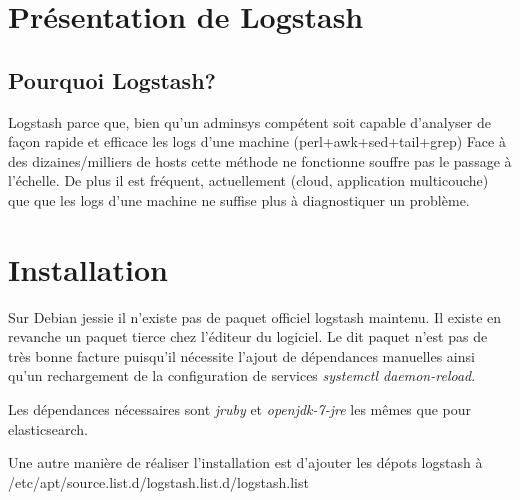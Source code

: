 \section{Présentation de Logstash}

\subsection{Pourquoi Logstash?}
Logstash parce que, bien qu'un adminsys compétent soit capable d'analyser
de façon rapide et efficace les logs d'une machine (perl+awk+sed+tail+grep)
Face à des dizaines/milliers de hosts cette méthode ne fonctionne souffre pas
le passage à l'échelle.
De plus il est fréquent, actuellement (cloud, application multicouche) que
que les logs d'une machine ne suffise plus à diagnostiquer un problème.

\section{Installation}
%
%
%
%
%
%
%
%
%
%
%
%




Sur Debian jessie il n'existe pas de paquet officiel logstash maintenu. Il existe 
en revanche un paquet tierce chez l'éditeur du logiciel. Le dit paquet n'est pas 
de très bonne facture  puisqu'il nécessite l'ajout de dépendances manuelles ainsi
qu'un rechargement de la configuration de services  \emph{systemctl daemon-reload}.

Les dépendances nécessaires sont \emph{jruby} et \emph{openjdk-7-jre} les mêmes 
que pour elasticsearch.

Une autre manière de réaliser l'installation est d'ajouter les dépots logstash à 
/etc/apt/source.list.d/logstash.list.d/logstash.list

